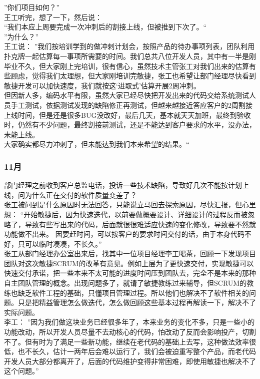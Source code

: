 ”你们项目如何？”\\
王工听完，想了一下，然后说：\\
“我们本应上周要完成一次冲刺后的割接上线，但被推到下次了。“\\
”为什么？”\\
王工说： ”我们按培训学到的做冲刺计划会，按照产品的待办事项列表，团队利用扑克牌一起估算每一事项所需要的时间。我们总共八位开发人员，其中有一半是刚毕业不久，但大家刚上完培训，很有信心，虽然技术主管张工对我们出来的估算有些顾虑，觉得我们太理想，但大家刚培训完敏捷，张工也希望让部门经理尽快看到敏捷开发可以加快速度，我们就按这‘进取式’估算开展2周冲刺。\\
但因新人多，编码水平有限，虽然大家已经尽快把开发出来的代码交给系统测试人员手工测试，依据测试发现的缺陷修正再测试，但越来越接近答应客户的2周割接上线时间，但是还是很多BUG没改好，最后几天，基本就天天加班，最终到验收时，仍然有不少问题，最终割接前测试，还是不能达到客户要求的水平，没办法，未能上线。\\
大家确实都尽力冲刺了，但未能达到我们本来希望的结果。“ \\

\hypertarget{ux6708-4}{%
\subsubsection{11月}\label{ux6708-4}}

部门经理之前收到客户总监电话，投诉一些技术缺陷，导致好几次不能按计划上线，问为什么正在交付的软件质量变差了？\\

张工被问到是什么原因时无法回答，只能说立马回去探索原因，尽快汇报，但心里想： “开始敏捷后，因为快速迭代，以前要做概要设计、详细设计的过程反而被忽略了，导致有些写出来的代码，后面就很很难适应快速的变化修改，导致要不然就功能做不出来。 因要赶时间，可以按客户的要求时间交付的话，由于本身代码不好，只可以临时凑凑，不长久。”\\
张工从部门经理办公室出来后，找其中一位项目经理李工喝茶，回顾一下发现项目团队对这次敏捷SCRUM的改革有意见。例如上层为了更快速交付，实现敏捷可以快速交付承诺，把一些本来不太可能的进度时间压到团队去，完全不是本来的那种自主团队管理的概念。出现问题多了，就请了敏捷教练过来辅导，但SCRUM的教练也缺乏软件工程的基础，只懂项目管理过程。所以他们也解决不了软件相关的问题。只是把精益管理怎么做迭代，怎么做回顾这些基本过程再解读一下，解决不了实际问题。\\

李工：
”因为我们做这块业务已经很多年了，本来业务的变化不多，只是一些小的功能改动，所以开发人员尽量不去动核心的代码，怕改动了反而会影响投产，切割不了。但有时为了满足一些新功能，继续在老代码的基础上去写，这种做法效率很低，也不长久，估计一两年后会难以运行了，我们会被迫重写整个产品，而老代码开发人员大部分都离开了，后面的代码维护变得非常困难，即使用敏捷也解决不了这个问题。”\\

